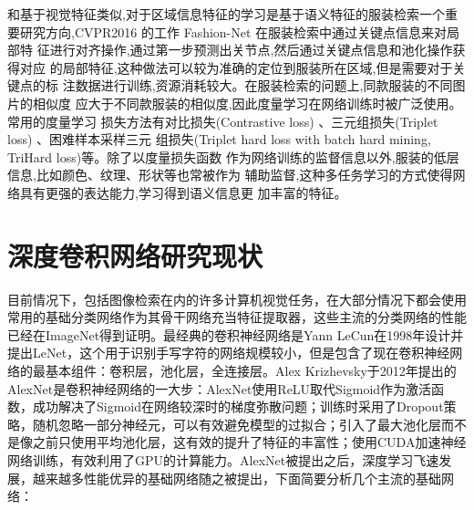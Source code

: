和基于视觉特征类似,对于区域信息特征的学习是基于语义特征的服装检索一个重
要研究方向,CVPR2016 的工作 Fashion-Net\cite{liu2016deepfashion} 在服装检索中通过关键点信息来对局部特
征进行对齐操作,通过第一步预测出关节点,然后通过关键点信息和池化操作获得对应
的局部特征,这种做法可以较为准确的定位到服装所在区域,但是需要对于关键点的标
注数据进行训练,资源消耗较大。在服装检索的问题上,同款服装的不同图片的相似度
应大于不同款服装的相似度,因此度量学习在网络训练时被广泛使用。常用的度量学习
损失方法有对比损失(Contrastive loss)
、三元组损失(Triplet loss)
、困难样本采样三元
组损失(Triplet hard loss with batch hard mining, TriHard loss)等。除了以度量损失函数
作为网络训练的监督信息以外,服装的低层信息,比如颜色、纹理、形状等也常被作为
辅助监督,这种多任务学习的方式使得网络具有更强的表达能力,学习得到语义信息更
加丰富的特征。

\section{深度卷积网络研究现状}
目前情况下，包括图像检索在内的许多计算机视觉任务，在大部分情况下都会使用常用的基础分类网络作为其骨干网络充当特征提取器，这些主流的分类网络的性能已经在ImageNet得到证明。最经典的卷积神经网络是Yann LeCun在1998年设计并提出LeNet，这个用于识别手写字符的网络规模较小，但是包含了现在卷积神经网络的最基本组件：卷积层，池化层，全连接层。Alex Krizhevsky于2012年提出的AlexNet是卷积神经网络的一大步：AlexNet使用ReLU取代Sigmoid作为激活函数，成功解决了Sigmoid在网络较深时的梯度弥散问题；训练时采用了Dropout策略，随机忽略一部分神经元，可以有效避免模型的过拟合；引入了最大池化层而不是像之前只使用平均池化层，这有效的提升了特征的丰富性；使用CUDA加速神经网络训练，有效利用了GPU的计算能力。AlexNet被提出之后，深度学习飞速发展，越来越多性能优异的基础网络随之被提出，下面简要分析几个主流的基础网络：
